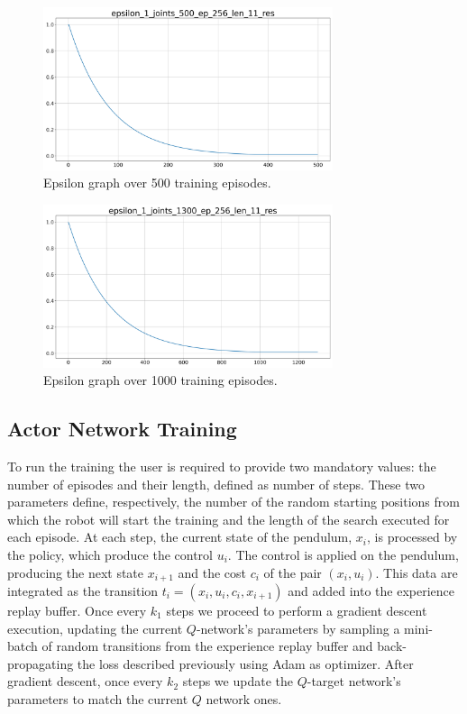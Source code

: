 \documentclass[twocolumn, a4paper]{article}
\begin{document}
\label{fig:TrainLoss1}
\begin{figure}[H]
	\centering
	\includegraphics[width=8.5cm]{"../Figures/epsilon_1J_500E_256EL_11RES.png"} \\
	\caption{Epsilon graph over 500 training episodes.}
	\includegraphics[width=8.5cm]{"../Figures/epsilon_1J_1300E_256EL_11RES.png"}
	\caption{Epsilon graph over 1000 training episodes.}
\end{figure}

\subsection{Actor Network Training}
To run the training the user is required to provide two mandatory values: the
number of episodes and their length, defined as number of steps.
These two parameters define, respectively, the number of the random starting
positions from which the robot will start the training and the length of the
search executed for each episode. At each step, the current state of the
pendulum, \(x_{i}\), is processed by the policy, which produce the control
\(u_{i}\). The control is applied on the pendulum, producing the
next state \(x_{i+1}\) and the cost \(c_{i}\) of the pair
\((x_{i},u_{i})\). This data are integrated as the transition \(t_{i}=(x_{i},
u_{i}, c_{i}, x_{i+1})\) and added into the experience replay buffer. Once
every \(k_{1}\) steps we proceed to perform a gradient descent execution,
updating the current \(Q\)-network's parameters by sampling a mini-batch of
random transitions from the experience replay buffer and back-propagating the
loss described previously using Adam as optimizer. After gradient descent, once
every \(k_{2}\) steps we update the \(Q\)-target network's parameters to match
the current \(Q\) network ones.
\end{document}
